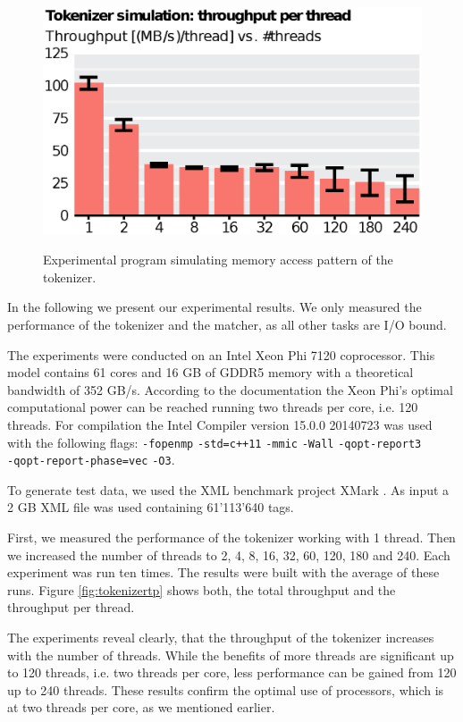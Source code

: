 \begin{figure}
    \includegraphics[scale=.45]{img/def/tokenizer_sim.eps} 
    \label{fig:tokenizersim}
    \caption{Experimental program simulating memory access pattern of the
    tokenizer.}
\end{figure}


In the following we present our experimental results. We only measured the
performance of the tokenizer and the matcher, as all other tasks are I/O bound.

 The experiments were conducted on an Intel Xeon Phi
7120 coprocessor. This model contains 61 cores and 16 GB of GDDR5 memory with a
theoretical bandwidth of 352 GB/s. According to the documentation the Xeon Phi's
optimal computational power can be reached running two threads per core, i.e.
120 threads. For compilation the Intel Compiler version 15.0.0 20140723 was used
with the following flags: \verb;-fopenmp; \verb;-std=c++11; \verb;-mmic;
\verb;-Wall; \verb;-qopt-report3; \\ \verb;-qopt-report-phase=vec; \verb;-O3;.

To generate test data, we used the XML benchmark project XMark
\cite{Schmidt2002}. As input a 2 GB XML file was used containing 61'113'640
tags. 

 First, we measured the performance of the tokenizer working
with 1 thread. Then we increased the number of threads to 2, 4, 8, 16, 32, 60,
120, 180 and 240.  Each experiment was run ten times. The results were built
with the average of these runs. Figure \ref{fig:tokenizertp} shows both, the
total throughput and the throughput per thread.

The experiments reveal clearly, that the throughput of the tokenizer increases
with the number of threads. While the benefits of more threads are significant
up to 120 threads, i.e. two threads per core, less performance can be gained
from 120 up to 240 threads. These results confirm the optimal use of processors,
which is at two threads per core, as we mentioned earlier.

